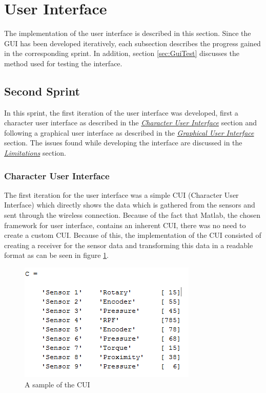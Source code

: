 \section{User Interface}
\label{sec:gui}
The implementation of the user interface is described in this section. Since the GUI has been developed iteratively, each subsection describes the progress gained in the corresponding sprint. In addition, section \ref{sec:GuiTest} discusses the method used for testing the interface.
\subsection{Second Sprint}

In this sprint, the first iteration of the user interface was developed, first a character user interface as described in the  \hyperref[sec:CUI]{\textit{Character User Interface}} section and following a graphical user interface as described in the \hyperref[sec:GUIS1]{\textit{Graphical User Interface}} section. The issues found while developing the interface are discussed in the \hyperref[sec:LimS1]{\textit{Limitations}} section.
\subsubsection{Character User Interface}
\label{sec:CUI}
The first iteration for the user interface was a simple CUI (Character User Interface) which directly shows the data which is gathered from the sensors and sent through the wireless connection. Because of the fact that Matlab, the chosen framework for user interface, contains an inherent CUI, there was no need to create a custom CUI. Because of this, the implementation of the CUI consisted of creating a receiver for the sensor data and transforming this data in a readable format as can be seen in figure \ref{fig:CUIV1}. 

\begin{figure}[H]
	\centering
	\includegraphics[width=.75\textwidth]{images/CUI}
	\caption{A sample of the CUI} 
	\label{fig:CUIV1}
\end{figure} 

